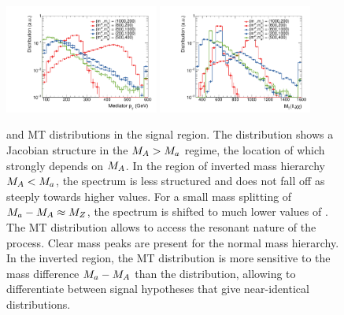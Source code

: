 \begin{figure}
\centering
\includegraphics[width=0.45\textwidth]{texinputs/04_grid/figures/monoz/leptonic/dmwg-final_h_pt_med_dm.pdf}
\includegraphics[width=0.45\textwidth]{texinputs/04_grid/figures/monoz/leptonic/dmwg-final_h_mt_total.pdf}
\caption{\MET and  MT distributions in the signal region. The \MET distribution shows a Jacobian structure in the $M_{A} > M_{a}$ regime, the location of which strongly depends on $M_{A}$. In the region of inverted mass hierarchy $M_{A} < M_{a}$, the spectrum is less structured and does not fall off as steeply towards higher values. For a small mass splitting of $M_{a}-M_{A}\approx M_{Z}$, the spectrum is shifted to much lower values of \MET. The MT distribution allows to access the resonant nature of the process. Clear mass peaks are present for the normal mass hierarchy. In the inverted region, the MT distribution is more sensitive to the mass difference $M_{a}-M_{A}$ than the \MET distribution, allowing to differentiate between signal hypotheses that give near-identical \MET distributions. }
\end{figure}

